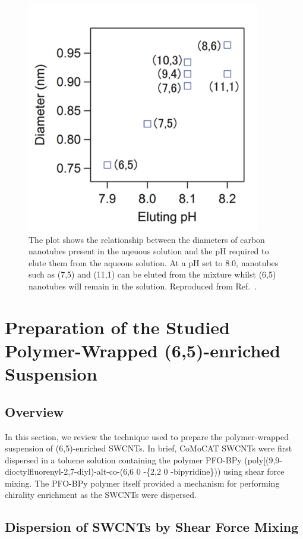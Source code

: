 \begin{figure}[H]
	\centering
	\includegraphics{images/chapter_methods/elute_ph}
	\caption{The plot shows the relationship between the diameters of carbon nanotubes present in the aqeuous solution and the pH required to elute them from the aqueous solution. At a pH set to $8.0$, nanotubes such as (7,5) and (11,1) can be eluted from the mixture whilst (6,5) nanotubes will remain in the solution.  Reproduced from Ref.\ \cite{ichinose2017extraction}.}
	\label{fig:elute_ph}
\end{figure}

\section{Preparation of the Studied Polymer-Wrapped (6,5)-enriched Suspension}
\label{sec:polymer_susp}

\subsection{Overview}
In this section, we review the technique used to prepare the polymer-wrapped suspension of (6,5)-enriched SWCNTs. In brief, CoMoCAT SWCNTs were first dispersed in a toluene solution containing the polymer PFO-BPy (poly[(9,9-dioctylfluorenyl-2,7-diyl)-alt-co-(6,6 0 -\{2,2 0 -bipyridine\})) using shear force mixing. The PFO-BPy polymer itself provided a mechanism for performing chirality enrichment as the SWCNTs were dispersed.

\subsection{Dispersion of SWCNTs by Shear Force Mixing}

